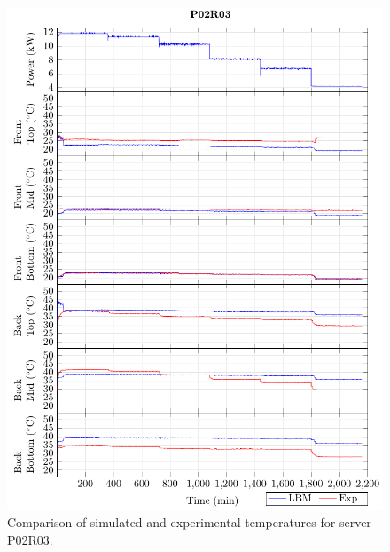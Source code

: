 \documentclass[border=10pt,preview]{standalone}
\begin{document}
\begin{figure}[!htb]
\centering
\includegraphics[width=\linewidth]{Plots/P02R03_T.pdf}
\caption{Comparison of simulated and experimental temperatures for server P02R03.}
\label{fig:P02R03_plot}
\end{figure}

\clearpage
\end{document}
